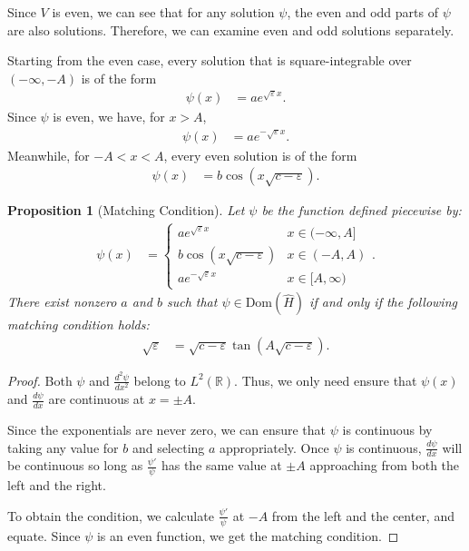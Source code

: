 \documentclass[12pt]{extarticle}
\newcommand{\R}{\mathbb{R}}
\theoremstyle{plain}
\newtheorem*{proposition}{Proposition}%
\theoremstyle{definition}
\theoremstyle{remark}
\renewcommand{\newline}{\hfill\break}
\begin{document}
  Since $V$ is even, we can see that for any solution $\psi$, the even and odd parts of $\psi$ are also solutions. Therefore, we can examine even and odd solutions separately.\newline

  Starting from the even case, every solution that is square-integrable over $(-\infty,-A)$ is of the form
  \begin{align*}
    \psi(x) &= ae^{ \sqrt{ \varepsilon }x }.
  \end{align*}
  Since $\psi$ is even, we have, for $x > A$,
  \begin{align*}
    \psi(x) &= a e^{-\sqrt{ \varepsilon }x}.
  \end{align*}
  Meanwhile, for $-A < x < A$, every even solution is of the form
  \begin{align*}
    \psi(x) &= b \cos\left(x\sqrt{c - \varepsilon }\right).
  \end{align*}
  \begin{proposition}[Matching Condition]
    Let $\psi$ be the function defined piecewise by:
    \begin{align*}
      \psi(x) &= \begin{cases}
        ae^{\sqrt{ \varepsilon }x} & x \in (-\infty,A]\\
        b\cos\left(x\sqrt{c - \varepsilon}\right) & x\in (-A,A)\\
        ae^{-\sqrt{ \varepsilon }x} & x\in [A,\infty)
      \end{cases}.
    \end{align*}
    There exist nonzero $a$ and $b$ such that $\psi\in \text{Dom}(\hat{H})$ if and only if the following matching condition holds:
    \begin{align*}
      \sqrt{ \varepsilon} &= \sqrt{c - \varepsilon}\tan\left(A\sqrt{c - \varepsilon}\right).
    \end{align*}
  \end{proposition}
  \begin{proof}
    Both $\psi$ and $\frac{d ^2\psi}{d x^2}$ belong to $L^{2}(\R)$. Thus, we only need ensure that $\psi(x)$ and $\frac{d \psi}{d x}$ are continuous at $x = \pm A$.\newline

    Since the exponentials are never zero, we can ensure that $\psi$ is continuous by taking any value for $b$ and selecting $a$ appropriately. Once $\psi$ is continuous, $\frac{d \psi}{d x}$ will be continuous  so long as $\frac{\psi'}{\psi}$ has the same value at $\pm A$ approaching from both the left and the right.\newline

    To obtain the condition, we calculate $\frac{\psi'}{\psi}$ at $-A$ from the left and the center, and equate.  Since $\psi$ is an even function, we get the matching condition.
  \end{proof}
\end{document}
